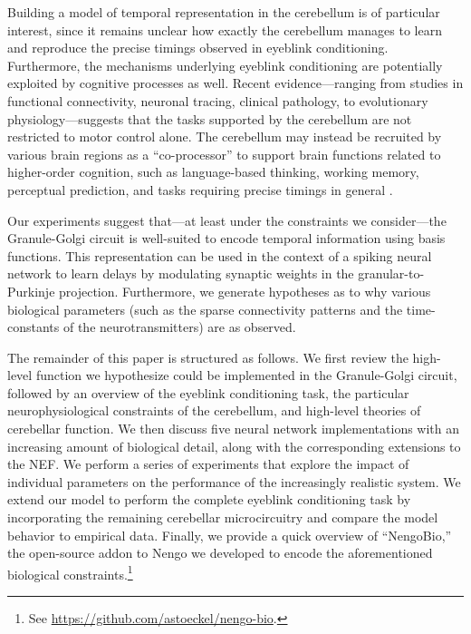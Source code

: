 Building a model of temporal representation in the cerebellum is of particular interest, since it remains unclear how exactly the cerebellum manages to learn and reproduce the precise timings observed in eyeblink conditioning. Furthermore, the mechanisms underlying eyeblink conditioning are potentially exploited by cognitive processes as well. Recent evidence---ranging from studies in functional connectivity, neuronal tracing, clinical pathology, to evolutionary physiology---suggests that the tasks supported by the cerebellum are not restricted to motor control alone. The cerebellum may instead be recruited by various brain regions as a \enquote{co-processor} to support brain functions related to higher-order cognition, such as language-based thinking, working memory, perceptual prediction, and tasks requiring precise timings in general \citep{sullivan2010cognitive,
           buckner2013cerebellum,
		   oreilly2008cerebellum,
           e2014metaanalysis}.

Our experiments suggest that---at least under the constraints we consider---the Granule-Golgi circuit is well-suited to encode temporal information using basis functions. This representation can be used in the context of a spiking neural network to learn delays by modulating synaptic weights in the granular-to-Purkinje projection.
Furthermore, we generate hypotheses as to why various biological parameters (such as the sparse connectivity patterns and the time-constants of the neurotransmitters) are as observed.

The remainder of this paper is structured as follows.
We first review the high-level function we hypothesize could be implemented in the Granule-Golgi circuit, followed by an overview of the eyeblink conditioning task, the particular neurophysiological constraints of the cerebellum, and high-level theories of cerebellar function.
We then discuss five neural network implementations with an increasing amount of biological detail, along with the corresponding extensions to the NEF.
We perform a series of experiments that explore the impact of individual parameters on the performance of the increasingly realistic system.
We extend our model to perform the complete eyeblink conditioning task by incorporating the remaining cerebellar microcircuitry and compare the model behavior to empirical data.
Finally, we provide a quick overview of \enquote{NengoBio,} the open-source addon to Nengo we developed to encode the aforementioned biological constraints.\footnote{See \url{https://github.com/astoeckel/nengo-bio}.}
